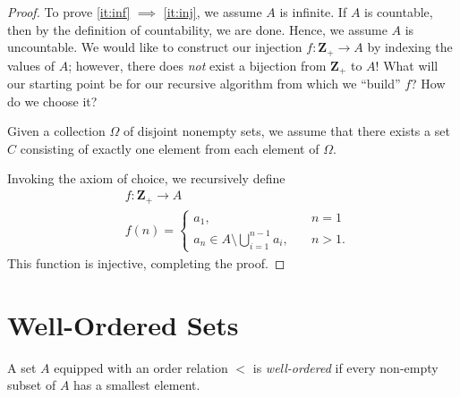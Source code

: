 \begin{proof}
	To prove \cref{it:inf} $\implies$ \cref{it:inj}, we assume $A$ is infinite.
	If $A$ is countable, then by the definition of countability, we are done.
	Hence, we assume $A$ is uncountable. We would like to construct our injection
	$f: \mathbf{Z}_{+} \to A$ by indexing the values of $A$; however, there does
	\emph{not} exist a bijection from $\mathbf{Z}_{+}$ to $A$! What will our starting
	point be for our recursive algorithm from which we ``build'' $f$? How do we
	choose it?
	\begin{remark}
		Given a collection $\Omega$ of disjoint nonempty sets, we assume that there exists a set $C$ consisting of exactly one element from each element of $\Omega$.
	\end{remark} Invoking the axiom of choice, we recursively define
	\begin{equation*}
		\begin{split}
			& f: \mathbf{Z}_{+} \to A \\
			& f(n) = \begin{cases}
				a_{1}, & \quad n = 1 \\
				a_{n} \in A \setminus
			\bigcup_{i=1}^{n-1} a_{i}, & \quad n > 1.\end{cases}
		\end{split}
	\end{equation*}
	This function is injective, completing the proof.
\end{proof}
\section{Well-Ordered Sets}
\begin{definition}
	A set $A$ equipped with an order relation $<$ is \emph{well-ordered}
	if every non-empty subset of $A$ has a smallest element.
	\label{def:well-ordered}
\end{definition}

